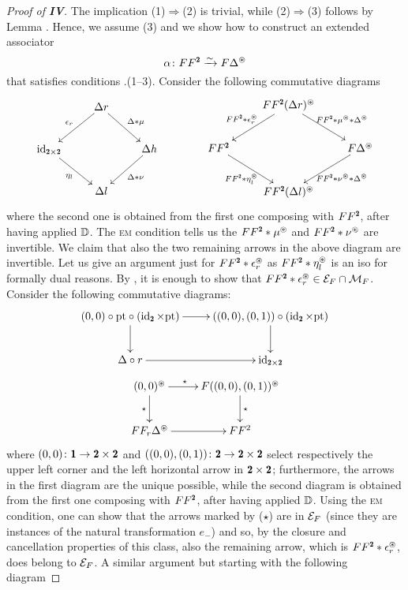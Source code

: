 \begin{proof}[Proof of \athm\textbf{IV}]
The implication (1)$\Rightarrow$(2) is trivial, while (2)$\Rightarrow$(3) follows by Lemma . Hence, we assume (3)  and we show how to construct an extended associator 
\[
\alpha\colon FF^\due \xto{\sim} F\Delta^\circledast
\] 
that satisfies conditions .(1--3). Consider the following commutative diagrams
\[
\vcenter{
\xymatrix{
& \Delta r \ar[dr]^{\Delta* \mu}\ar[dl]_{\epsilon_r}& \\
\id_{\due\times \due}\ar[dr]_{ \eta_l}&& \Delta h\ar[dl]^{ \Delta*\nu}\\
& \Delta l}
}
\qquad\qquad\vcenter
{\xymatrix{
& FF^\due (\Delta r)^\circledast \ar[dr]^{FF^\due * \mu^\circledast*\Delta^{\circledast}}\ar[dl]_{FF^\due * \epsilon_r^{\circledast}}& \\
FF^\due \ar[dr]_{FF^\due * \eta_l^\circledast}&& F\Delta^\circledast\ar[dl]^{FF^\due * \nu^\circledast*\Delta^{\circledast}}\\
& FF^\due (\Delta l)^\circledast
}}
\]
where the second one is obtained from the first one composing with $FF^\due$, after having applied $\mathbb{D}$. The \textsc{em} condition tells us the $FF^\due*\mu^\circledast$ and $FF^\due*\nu^\circledast$ are invertible. We claim that also the two remaining arrows in the above diagram are invertible. Let us give an argument just for $FF^\due * \epsilon_r^{\circledast}$ as $FF^\due * \eta_l^{\circledast}$ is an iso for formally dual reasons. By , it is enough to show that $FF^\due * \epsilon_r^{\circledast}\in \E_F\cap \M_F$. Consider the following commutative diagrams:
\[
\xymatrix{
(0,0)\circ\pt\circ(\id_\due\times \pt)\ar[r]\ar[d]&((0,0),(0,1))\circ(\id_\due\times \pt)\ar[d]\\
\Delta\circ r\ar[r]&\id_{\due\times \due}}
\]
\[
\xymatrix{
(0,0)^\circledast\ar[r]^(.39){\star}\ar[d]_{\star}&F ((0,0),(0,1))^\circledast\ar[d]^{\star}\\
FF_r\Delta^\circledast\ar[r]&FF^2}
\]
where $(0,0)\colon \uno\to \due\times \due$ and $((0,0),(0,1))\colon \due\to\due\times \due$ select respectively the upper left corner and the left horizontal arrow in $\due\times \due$; furthermore, the arrows in the first diagram are the unique possible, while the second diagram is obtained from the first one composing with $FF^\due$, after having applied $\mathbb{D}$. Using the \textsc{em} condition, one can show that the arrows marked by ($\star$) are in $\mathcal{E}_F$ (since they are instances of the natural transformation $e_{-}$) and so, by the closure and cancellation properties of this class, also the remaining arrow, which is $FF^\due * \epsilon_r^{\circledast}$, does belong to $\mathcal{E}_F$. A similar argument but starting with the following diagram 

\end{proof}
